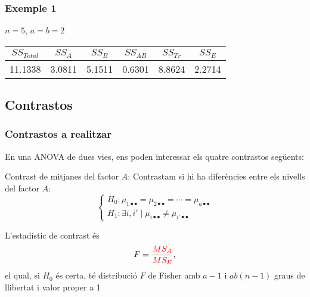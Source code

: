\documentclass[12pt,t]{beamer}
\newcommand{\red}[1]{\textcolor{red}{#1}}
\newcommand{\blue}[1]{\textcolor{blue}{#1}}
\renewcommand{\emph}[1]{{\color{red}#1}}
\theoremstyle{plain}
\theoremstyle{definition}
\begin{document}
\begin{frame} 
\frametitle{Exemple 1}

$n=5$, $a=b=2$
\medskip

\begin{center}
\begin{tabular}{cccccc}
$SS_{Total}$ & $SS_A$ & $SS_B$ &  $SS_{AB}$ & $SS_{Tr}$ &  $SS_E$\\ \hline
11.1338  & 3.0811  &  5.1511 &  0.6301 &  8.8624    &  2.2714
\end{tabular}
\bigskip


\end{center}
%
%

\end{frame}









\subsection{Contrastos}



\begin{frame}
\frametitle{Contrastos a realitzar}

En una ANOVA de dues vies, ens poden interessar 
els quatre contrastos següents:
\bigskip

 \emph{Contrast de mitjanes del factor $A$}: Contrastam si  hi ha diferències entre els nivells del factor $A$:
$$
\left\{
\begin{array}{l}
H_0 : \mu_{1\bullet\bullet}=\mu_{2\bullet\bullet}=\cdots
=\mu_{a\bullet\bullet} \\
H_1 :  \exists i,i'\mid  \mu_{i\bullet\bullet}
\not = \mu_{i'\bullet\bullet}
\end{array}
\right.
$$
\medskip

L'estadístic de contrast és
$$
F=\red{\frac{MS_A}{MS_E}},
$$
el qual, si $H_0$ és certa, té
distribució $F$ de Fisher amb $a-1$ i $ab(n-1)$ graus de llibertat i valor proper a 1

\end{frame}
\end{document}
